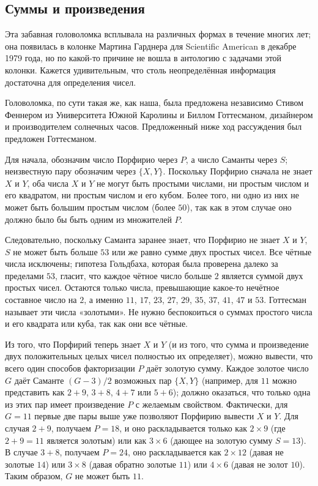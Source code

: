 \subsection*{Суммы и произведения}

Эта забавная головоломка всплывала на различных формах в течение многих лет; она появилась в колонке Мартина Гарднера для Scientific American в декабре 1979 года, но по какой-то причине не вошла в антологию \cite{29} с задачами этой колонки.
Кажется удивительным, что столь неопределённая информация достаточна для определения чисел.

Головоломка, по сути такая же, как наша, была предложена независимо Стивом Феннером из Университета Южной Каролины и Биллом Готтесманом, дизайнером и производителем солнечных часов. Предложенный ниже ход рассуждения был предложен Готтесманом.

Для начала, обозначим число Порфирио через $P$, а число Саманты через $S$;
неизвестную пару обозначим через $\{X, Y\}$.
Поскольку Порфирио сначала не знает $X$ и $Y$, оба числа $X$ и $Y$ не могут быть простыми числами,
ни простым числом и его квадратом,
ни простым числом и его кубом.
Более того, ни одно из них не может быть большим простым числом (более $50$), так как в этом случае оно должно было бы быть одним из множителей $P$.

Следовательно, поскольку Саманта заранее знает, что Порфирио не знает  $X$ и $Y$,
$S$ не может быть больше $53$ или же равно сумме двух простых чисел.
Все чётные числа исключены; гипотеза Гольдбаха, которая была проверена далеко за пределами $53$, гласит, что каждое чётное число больше $2$ является суммой двух простых чисел.
Остаются только числа, превышающие какое-то нечётное составное число на $2$, а именно $11$, $17$, $23$, $27$, $29$, $35$, $37$, $41$, $47$ и $53$.
Готтесман называет эти числа «золотыми».
Не нужно беспокоиться о суммах простого числа и его квадрата или куба, так как они все чётные.

Из того, что Порфирий теперь знает $X$ и $Y$ (и из того, что сумма и произведение двух положительных целых чисел полностью их определяет), можно вывести, что всего один способов факторизации $P$ даёт золотую сумму. 
Каждое золотое число $G$ даёт Саманте $(G - 3)/2$ возможных пар $\{X, Y\}$
(например, для $11$ можно представить как $2 + 9$, $3 + 8$, $4 + 7$ или $5 + 6$); должно оказаться, что только одна из этих пар имеет произведение $P$ с желаемым свойством.
Фактически, для $G = 11$ первые две пары выше уже позволяют Порфирию вывести $X$ и $Y$.
Для случая $2 + 9$, получаем $P = 18$, и оно раскладывается только как $2 \times 9$ (где $2 + 9 = 11$ является золотым) или как $3 \times 6$ (дающее на золотую сумму $S = 13$).
В случае $3 + 8$, получаем $P = 24$, оно раскладывается как $2 \times 12$ (давая не золотые $14$) или $3 \times 8$ (давая обратно золотые $11$) или $4 \times 6$ (давая не золот $10$).
Таким образом, $G$ не может быть $11$.

